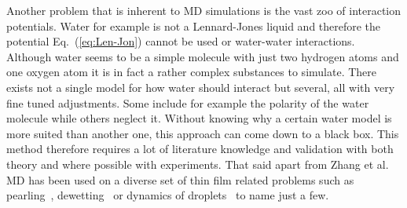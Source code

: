 Another problem that is inherent to MD simulations is the vast zoo of interaction potentials.
Water for example is not a Lennard-Jones liquid and therefore the potential Eq.~(\ref{eq:Len-Jon}) cannot be used or water-water interactions.
Although water seems to be a simple molecule with just two hydrogen atoms and one oxygen atom it is in fact a rather complex substances to simulate.
There exists not a single model for how water should interact but several, all with very fine tuned adjustments.
Some include for example the polarity of the water molecule while others neglect it.
Without knowing why a certain water model is more suited than another one, this approach can come down to a black box.
This method therefore requires a lot of literature knowledge and validation with both theory and where possible with experiments.
That said apart from Zhang et al.~\cite{zhangMolecularSimulationThin2019} MD has been used on a diverse set of thin film related problems such as pearling~\cite{koplikPearlingInstabilityNanoscale2006}, dewetting~\cite{bertrandDynamicsDewettingNanoscale2007} or dynamics of droplets~\cite{liuActuatingWaterDroplets2015, wangMolecularDynamicsSimulations2015} to name just a few.

